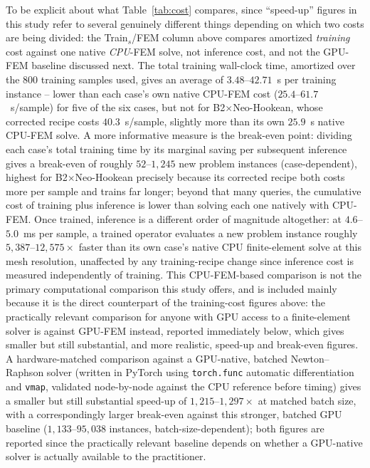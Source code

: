 \documentclass[final,5p,times]{elsarticle}
\begin{document}
To be explicit about what Table~\ref{tab:cost} compares, since
``speed-up'' figures in this study refer to several genuinely different
things depending on which two costs are being divided: the
Train$_s$/FEM column above compares amortized \emph{training} cost
against one native \emph{CPU}-FEM solve, not inference cost, and not the
GPU-FEM baseline discussed next. The total training wall-clock time,
amortized over the 800 training samples used, gives an average of
$3.48$--$42.71$~s per training instance -- lower than each case's own
native CPU-FEM cost ($25.4$--$61.7$~s/sample)
for five of the six cases, but not for B2$\times$Neo-Hookean, whose
corrected recipe costs $40.3$~s/sample, slightly more than its own
$25.9$~s native CPU-FEM solve. A more informative
measure is the break-even point: dividing each case's total training time
by its marginal saving per subsequent inference gives a break-even of
roughly $52$--$1{,}245$ new problem instances (case-dependent), highest
for B2$\times$Neo-Hookean precisely because its corrected recipe both
costs more per sample and trains far longer; beyond that many queries,
the cumulative cost of training plus inference is lower than solving each
one natively with CPU-FEM. Once trained, inference is a different order of
magnitude altogether: at $4.6$--$5.0$~ms per sample, a trained operator
evaluates a new problem instance roughly $5{,}387$--$12{,}575\times$
faster than its own case's native CPU finite-element solve at this mesh
resolution, unaffected by any training-recipe change since inference cost
is measured independently of training. This CPU-FEM-based comparison is
not the primary computational comparison this study offers, and is
included mainly because it is the direct counterpart of the training-cost
figures above: the practically relevant comparison for anyone with GPU
access to a finite-element solver is against GPU-FEM instead, reported
immediately below, which gives smaller but still substantial, and more
realistic, speed-up and break-even figures. A hardware-matched comparison
against a GPU-native, batched
Newton\mbox{--}Raphson solver (written in PyTorch using \texttt{torch.func}
automatic differentiation and \texttt{vmap}, validated node-by-node against
the CPU reference before timing) gives a smaller but still substantial
speed-up of $1{,}215$--$1{,}297\times$ at matched batch size, with a
correspondingly larger break-even against this stronger, batched GPU
baseline ($1{,}133$--$95{,}038$ instances, batch-size-dependent); both
figures are reported since the practically relevant baseline depends on
whether a GPU-native solver is actually available to the practitioner.
\end{document}
